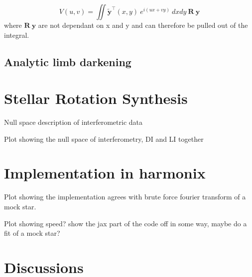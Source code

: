 \documentclass[modern]{aastex631}
\begin{document}
\begin{equation}
   V(u,v) = \iint \mathbf{\tilde{y}}^\top(x,y) \ e^{i(ux + vy)} \ dxdy \ \mathbf{R} \ \mathbf{y}
\end{equation}
where $\mathbf{R} \ \mathbf{y}$ are not dependant on x and y and can therefore be pulled out of the integral. 


\subsection{Analytic limb darkening}

\section{Stellar Rotation Synthesis}
\label{sec:rotsynthesis}
Null space description of interferometric data

Plot showing the null space of interferometry, DI and LI together
\section{Implementation in harmonix}
\label{sec:harmonix}
Plot showing the implementation agrees with brute force fourier transform of a mock star. 

Plot showing speed? show the jax part of the code off in some way, maybe do a fit of a mock star?
\section{Discussions}
\label{sec:discussions}


\end{document}
